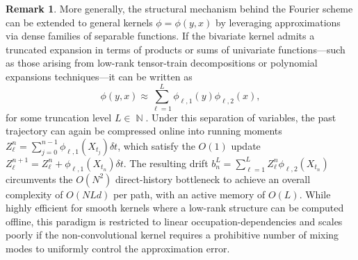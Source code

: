 \documentclass[11pt]{article}
\numberwithin{equation}{section}
\theoremstyle{plain}
\theoremstyle{definition}
\newtheorem{remark}{Remark}[section]
\DeclareMathOperator{\N}{\mathbb{N}}
\begin{document}
\begin{remark}
    More generally, the structural mechanism behind the Fourier scheme can be extended to general kernels $\phi = \phi(y,x)$  by leveraging approximations via dense families of separable functions. If the bivariate kernel admits a truncated expansion in terms of products or sums of univariate functions---such as those arising from low-rank tensor-train decompositions or  polynomial expansions techniques---it can be written as 
    $$\phi(y,x) \approx \sum_{\ell=1}^L \phi_{\ell,1}(y) \phi_{\ell,2}(x),$$ 
    for some truncation level $L\in \N$. Under this separation of variables, the past trajectory can again be compressed online into running moments $Z_\ell^n = \sum_{j=0}^{n-1} \phi_{\ell,1}(X_{t_j})\delta t$, which satisfy the  $O(1)$  update $Z_\ell^{n+1} = Z_\ell^n + \phi_{\ell,1}(X_{t_n})\delta t$. The resulting drift $
b_n^L =  \sum_{\ell=1}^L Z_\ell^n \phi_{\ell,2}(X_{t_n})$ 
circumvents the $O(N^2)$ direct-history bottleneck to achieve an overall  complexity of $O(N L d)$ per path, with an active memory  of $O(L)$. While highly efficient for smooth kernels where a low-rank structure can be computed offline, this paradigm is  restricted to linear occupation-dependencies and scales poorly if the non-convolutional kernel requires a prohibitive  number of mixing modes to  uniformly control the approximation error. 
\end{remark}
\end{document}
